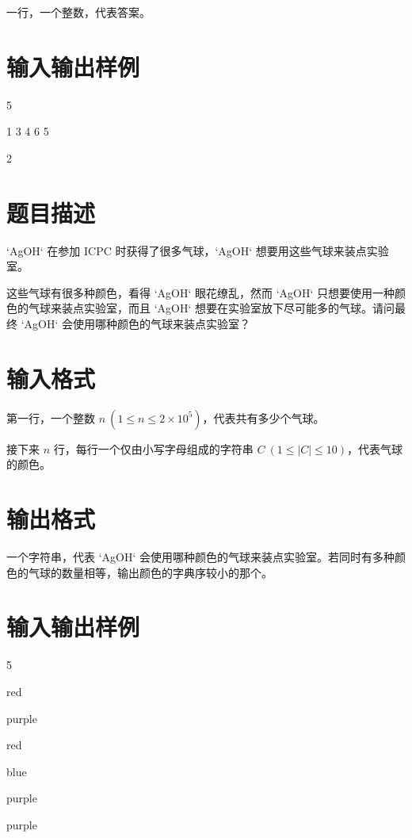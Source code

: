 \documentclass{ctpro}
\begin{document}
一行，一个整数，代表答案。

\section*{输入输出样例}
\testcasetab
{
	5\par
	1 3 4 6 5
}
{
	2
}

\makeproblem
\section*{题目描述}

`AgOH` 在参加 ICPC 时获得了很多气球，`AgOH` 想要用这些气球来装点实验室。

这些气球有很多种颜色，看得 `AgOH` 眼花缭乱，然而 `AgOH` 只想要使用一种颜色的气球来装点实验室，而且 `AgOH` 想要在实验室放下尽可能多的气球。请问最终 `AgOH` 会使用哪种颜色的气球来装点实验室？

\section*{输入格式}

第一行，一个整数 $n~(1 \leq n \leq 2 \times {10}^5)$，代表共有多少个气球。

接下来 $n$ 行，每行一个仅由小写字母组成的字符串 $C~(1 \leq |C| \leq 10)$，代表气球的颜色。

\section*{输出格式}

一个字符串，代表 `AgOH` 会使用哪种颜色的气球来装点实验室。若同时有多种颜色的气球的数量相等，输出颜色的字典序较小的那个。

\section*{输入输出样例}
\testcasetab
{
	5\par
	red\par
	purple\par
	red\par
	blue\par
	purple
}
{
	purple
}
\end{document}
